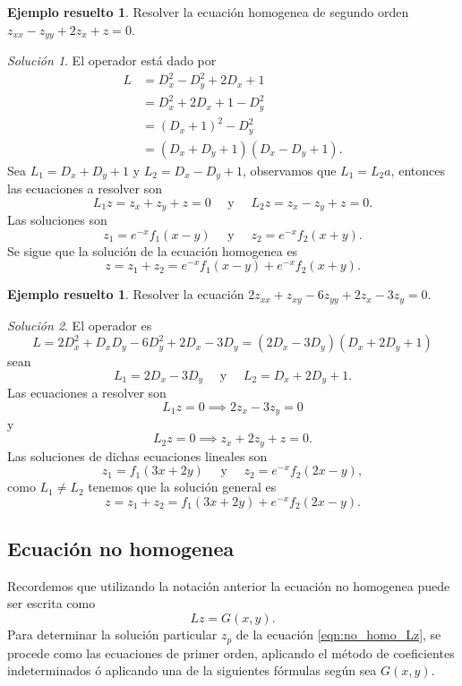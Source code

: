 \documentclass[11pt,letterpaper,draft]{report}
\theoremstyle{plain}
\theoremstyle{definition}
\newtheorem{solved}[theorem]{Ejemplo resuelto}
\theoremstyle{remark}
\newtheorem*{solution}{Solución}
\newcommand\<{\langle}
\renewcommand\>{\rangle}
\begin{document}
\begin{solved}
  Resolver la ecuación homogenea de segundo orden $z_{xx} -
z_{yy} + 2z_x + z = 0$.
\begin{solution}
  El operador está dado por
  \begin{align*}
    L &= D_x^2 - D_y^2 + 2D_x + 1\\
      &= D_x^2 + 2D_x + 1 - D_y^2\\
      &= (D_x+1)^2 - D_y^2\\
      &= (D_x + D_y + 1)(D_x - D_y + 1).
  \end{align*}
  Sea $L_1 = D_x + D_y + 1$ y $L_2 = D_x - D_y + 1$,
  observamos que $L_1 = L_2a$, entonces las ecuaciones a
  resolver son
  \[
  L_1 z = z_x + z_y + z = 0 \quad \text{ y } \quad L_2 z =
  z_x - z_y + z = 0.
  \] 
  Las soluciones son
  \[
  z_1 = e^{-x}f_1(x-y) \quad \text{ y } \quad z_2 =
  e^{-x}f_2(x+y).
  \] 
  Se sigue que la solución de la ecuación homogenea es
  \[
  z = z_1 + z_2 = e^{-x}f_1(x-y) + e^{-x}f_2(x+y).
  \] 
\end{solution}
\end{solved}

\begin{solved}
  Resolver la ecuación $2z_{xx} + z_{xy} - 6z_{yy} + 2z_x -
  3z_y = 0$.
  \begin{solution}
    El operador es
    \[
    L = 2D_x^2 + D_xD_y - 6D_y^2 + 2D_x - 3D_y =
    (2D_x-3D_y)(D_x+2D_y+1)
    \] 
    sean
    \[
    L_1 = 2D_x - 3D_y \quad \text{ y } \quad L_2 = D_x + 2D_y
    + 1.
    \] 
    Las ecuaciones a resolver son
    \[
    L_1z = 0 \implies 2z_x - 3z_y = 0
    \] 
    y
    \[
    L_2z = 0 \implies z_x + 2z_y + z = 0.
    \] 
    Las soluciones de dichas ecuaciones lineales son
    \[
    z_1 = f_1(3x+2y) \quad \text{ y } \quad z_2 =
    e^{-x}f_2(2x-y),
    \] 
    como $L_1 \neq L_2$ tenemos que la solución general es
    \[
    z = z_1 + z_2 = f_1(3x+2y) + e^{-x}f_2(2x-y).
    \] 
  \end{solution}
\end{solved}

\subsection{Ecuación no homogenea}

Recordemos que utilizando la notación anterior la ecuación
no homogenea puede ser escrita como
\begin{equation}
  \label{eqn:no_homo_Lz}
  Lz = G(x,y).
\end{equation}
Para determinar la solución particular $z_p$ de la ecuación
\ref{eqn:no_homo_Lz}, se procede como las ecuaciones de
primer orden, aplicando el método de coeficientes
indeterminados ó aplicando una de la siguientes fórmulas
según sea $G(x,y)$.
\end{document}
